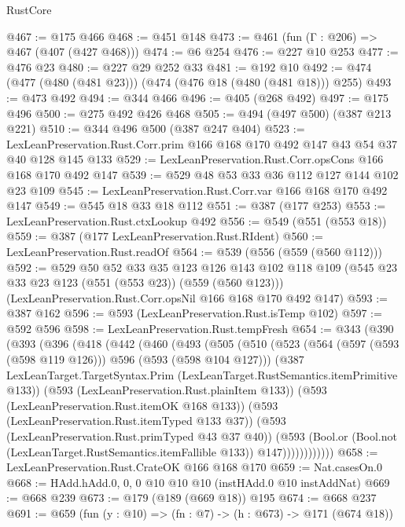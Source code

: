 \begin{lexlean}{RustCore}
\begin{coremodule}
@467 := @175 @466
@468 := @451 @148
@473 := @461 (fun (Γ : @206) => @467 (@407 (@427 @468)))
@474 := @6 @254
@476 := @227 @10 @253
@477 := @476 @23
@480 := @227 @29 @252 @33
@481 := @192 @10
@492 := @474 (@477 (@480 (@481 @23))) (@474 (@476 @18 (@480 (@481 @18))) @255)
@493 := @473 @492
@494 := @344 @466
@496 := @405 (@268 @492)
@497 := @175 @496
@500 := @275 @492 @426 @468
@505 := @494 (@497 @500) (@387 @213 @221)
@510 := @344 @496 @500 (@387 @247 @404)
@523 := LexLeanPreservation.Rust.Corr.prim @166 @168 @170 @492 @147 @43 @54 @37 @40 @128 @145 @133
@529 := LexLeanPreservation.Rust.Corr.opsCons @166 @168 @170 @492 @147
@539 := @529 @48 @53 @33 @36 @112 @127 @144 @102 @23 @109
@545 := LexLeanPreservation.Rust.Corr.var @166 @168 @170 @492 @147
@549 := @545 @18 @33 @18 @112
@551 := @387 (@177 @253)
@553 := LexLeanPreservation.Rust.ctxLookup @492
@556 := @549 (@551 (@553 @18))
@559 := @387 (@177 LexLeanPreservation.Rust.RIdent)
@560 := LexLeanPreservation.Rust.readOf
@564 := @539 (@556 (@559 (@560 @112)))
@592 := @529
    @50
    @52
    @33
    @35
    @123
    @126
    @143
    @102
    @118
    @109
    (@545 @23 @33 @23 @123 (@551 (@553 @23)) (@559 (@560 @123)))
    (LexLeanPreservation.Rust.Corr.opsNil @166 @168 @170 @492 @147)
@593 := @387 @162
@596 := @593 (LexLeanPreservation.Rust.isTemp @102)
@597 := @592 @596
@598 := LexLeanPreservation.Rust.tempFresh
@654 := @343
    (@390
      (@393
        (@396
          (@418
            (@442
              (@460
                (@493
                  (@505
                    (@510
                      (@523
                        (@564 (@597 (@593 (@598 @119 @126))) @596 (@593 (@598 @104 @127)))
                        (@387
                          LexLeanTarget.TargetSyntax.Prim
                          (LexLeanTarget.RustSemantics.itemPrimitive @133))
                        (@593 (LexLeanPreservation.Rust.plainItem @133))
                        (@593 (LexLeanPreservation.Rust.itemOK @168 @133))
                        (@593 (LexLeanPreservation.Rust.itemTyped @133 @37))
                        (@593 (LexLeanPreservation.Rust.primTyped @43 @37 @40))
                        (@593
                          (Bool.or
                            (Bool.not (LexLeanTarget.RustSemantics.itemFallible @133))
                            @147))))))))))))
@658 := LexLeanPreservation.Rust.CrateOK @166 @168 @170
@659 := Nat.casesOn.{0}
@668 := HAdd.hAdd.{0, 0, 0} @10 @10 @10 (instHAdd.{0} @10 instAddNat)
@669 := @668 @239
@673 := @179 (@189 (@669 @18)) @195
@674 := @668 @237
@691 := @659
    (fun (y : @10) => (fn : @7) -> (h : @673) -> @171 (@674 @18))

\end{coremodule}
\end{lexlean}
